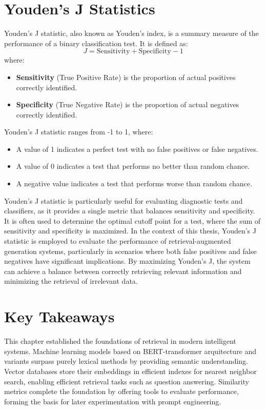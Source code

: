 \section{Youden's J Statistics}
\label{sec:youden}
Youden's J statistic, also known as Youden's index, is a summary measure of the performance of a binary classification test\cite{youden1950index}. It is defined as:
\[
J = \text{Sensitivity} + \text{Specificity} - 1
\]
where:
\begin{itemize}
    \item \textbf{Sensitivity} (True Positive Rate) is the proportion of actual positives correctly identified.
    \item \textbf{Specificity} (True Negative Rate) is the proportion of actual negatives correctly identified.
\end{itemize}
Youden's J statistic ranges from -1 to 1, where:
\begin{itemize}
    \item A value of 1 indicates a perfect test with no false positives or false negatives.
    \item A value of 0 indicates a test that performs no better than random chance.
    \item A negative value indicates a test that performs worse than random chance.
\end{itemize}
Youden's J statistic is particularly useful for evaluating diagnostic tests and classifiers, as it provides a single metric that balances sensitivity and specificity. It is often used to determine the optimal cutoff point for a test, where the sum of sensitivity and specificity is maximized\cite{fluss2005youden}.
In the context of this thesis, Youden's J statistic is employed to evaluate the performance of retrieval-augmented generation systems, particularly in scenarios where both false positives and false negatives have significant implications. By maximizing Youden's J, the system can achieve a balance between correctly retrieving relevant information and minimizing the retrieval of irrelevant data.
\section{Key Takeaways}
This chapter established the foundations of retrieval in modern intelligent systems. Machine learning models based on BERT-transformer \cite{bertpretrainingdeepbidirectional} arquitecture and variants surpass purely lexical methods by providing semantic understanding. Vector databases store their embeddings in efficient indexes for nearest neighbor search, enabling efficient retrieval tasks such as question answering. Similarity metrics complete the foundation by offering tools to evaluate performance, forming the basis for later experimentation with prompt engineering.

